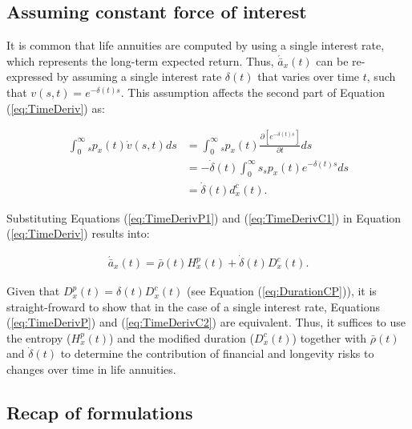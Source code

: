 \documentclass[12pt]{article}
\begin{document}
\subsection{Assuming constant force of interest}


It is common that life annuities are computed by using a single interest rate, which represents the long-term expected return. Thus, $\acute{\bar{a}}_x(t)$ can be re-expressed by assuming a single interest rate $\delta(t)$ that varies over time $t$, such that $v(s,t)=e^{-\delta(t)s}$. This assumption affects the second part of Equation (\ref{eq:TimeDeriv}) as: 




\begin{equation}\label{eq:TimeDerivC1}
\begin{split}
\int_0^\infty {}_s{p}_x(t) \dot{v}(s,t)ds &=\int_0^\infty {}_s{p}_x(t) \frac{\partial \left[ e^{-\delta(t)s} \right]}{\partial t}ds \\
&=-\dot{\delta}(t)\int_0^\infty s  {}_s{p}_x(t) e^{-\delta(t)s} ds \\
&=  \dot{\delta}(t)  d^{c}_x(t).
\end{split}
\end{equation}

Substituting Equations (\ref{eq:TimeDerivP1}) and (\ref{eq:TimeDerivC1}) in Equation (\ref{eq:TimeDeriv}) results into: 


\begin{equation}\label{eq:TimeDerivC2}
\begin{split}
\acute{\bar{a}}_x(t) =  \bar{\rho}(t){H}^{p}_x(t)+\dot{\delta}(t)  D^{c}_x(t).
\end{split}
\end{equation}



Given that ${D}^{p}_{x}(t)=\delta(t){D}^{c}_{x}(t)$ (see Equation (\ref{eq:DurationCP})), it is straight-froward to show that in the case of a single interest rate, Equations (\ref{eq:TimeDerivP})  and (\ref{eq:TimeDerivC2}) are equivalent. Thus, it suffices to use the entropy (${H}^{p}_x(t)$) and the modified duration ($D^{c}_x(t)$) together with $\bar{\rho}(t)$ and $\dot{\delta}(t)$ to determine the contribution of financial and longevity risks to changes over time in life annuities.





\subsection{Recap of formulations}
\end{document}
